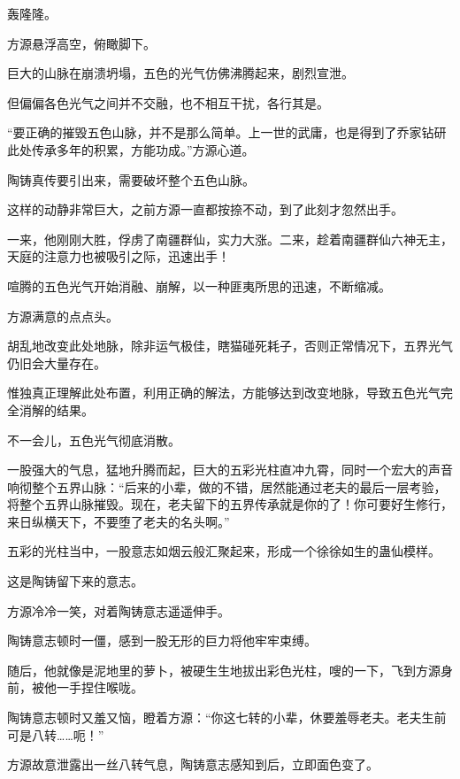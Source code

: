 
\begin{this_body}



轰隆隆。

方源悬浮高空，俯瞰脚下。

巨大的山脉在崩溃坍塌，五色的光气仿佛沸腾起来，剧烈宣泄。

但偏偏各色光气之间并不交融，也不相互干扰，各行其是。

“要正确的摧毁五色山脉，并不是那么简单。上一世的武庸，也是得到了乔家钻研此处传承多年的积累，方能功成。”方源心道。

陶铸真传要引出来，需要破坏整个五色山脉。

这样的动静非常巨大，之前方源一直都按捺不动，到了此刻才忽然出手。

一来，他刚刚大胜，俘虏了南疆群仙，实力大涨。二来，趁着南疆群仙六神无主，天庭的注意力也被吸引之际，迅速出手！

喧腾的五色光气开始消融、崩解，以一种匪夷所思的迅速，不断缩减。

方源满意的点点头。

胡乱地改变此处地脉，除非运气极佳，瞎猫碰死耗子，否则正常情况下，五界光气仍旧会大量存在。

惟独真正理解此处布置，利用正确的解法，方能够达到改变地脉，导致五色光气完全消解的结果。

不一会儿，五色光气彻底消散。

一股强大的气息，猛地升腾而起，巨大的五彩光柱直冲九霄，同时一个宏大的声音响彻整个五界山脉：“后来的小辈，做的不错，居然能通过老夫的最后一层考验，将整个五界山脉摧毁。现在，老夫留下的五界传承就是你的了！你可要好生修行，来日纵横天下，不要堕了老夫的名头啊。”

五彩的光柱当中，一股意志如烟云般汇聚起来，形成一个徐徐如生的蛊仙模样。

这是陶铸留下来的意志。

方源冷冷一笑，对着陶铸意志遥遥伸手。

陶铸意志顿时一僵，感到一股无形的巨力将他牢牢束缚。

随后，他就像是泥地里的萝卜，被硬生生地拔出彩色光柱，嗖的一下，飞到方源身前，被他一手捏住喉咙。

陶铸意志顿时又羞又恼，瞪着方源：“你这七转的小辈，休要羞辱老夫。老夫生前可是八转……呃！”

方源故意泄露出一丝八转气息，陶铸意志感知到后，立即面色变了。


\end{this_body}
